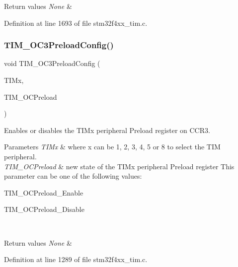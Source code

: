 \begin{DoxyRetVals}{Return values}
{\em None} & \\
\hline
\end{DoxyRetVals}


Definition at line 1693 of file stm32f4xx\+\_\+tim.\+c.

\mbox{\label{group___t_i_m_ga8b2391685a519e60e596b7d596f86f09}} 
\subsubsection{\texorpdfstring{T\+I\+M\+\_\+\+O\+C3\+Preload\+Config()}{TIM\_OC3PreloadConfig()}}
{\footnotesize\ttfamily void T\+I\+M\+\_\+\+O\+C3\+Preload\+Config (\begin{DoxyParamCaption}\item[{\hyperlink{struct_t_i_m___type_def}{T\+I\+M\+\_\+\+Type\+Def} $\ast$}]{T\+I\+Mx,  }\item[{uint16\+\_\+t}]{T\+I\+M\+\_\+\+O\+C\+Preload }\end{DoxyParamCaption})}



Enables or disables the T\+I\+Mx peripheral Preload register on C\+C\+R3. 


\begin{DoxyParams}{Parameters}
{\em T\+I\+Mx} & where x can be 1, 2, 3, 4, 5 or 8 to select the T\+IM peripheral. \\
\hline
{\em T\+I\+M\+\_\+\+O\+C\+Preload} & new state of the T\+I\+Mx peripheral Preload register This parameter can be one of the following values\+: \begin{DoxyItemize}
\item T\+I\+M\+\_\+\+O\+C\+Preload\+\_\+\+Enable \item T\+I\+M\+\_\+\+O\+C\+Preload\+\_\+\+Disable \end{DoxyItemize}
\\
\hline
\end{DoxyParams}

\begin{DoxyRetVals}{Return values}
{\em None} & \\
\hline
\end{DoxyRetVals}


Definition at line 1289 of file stm32f4xx\+\_\+tim.\+c.

